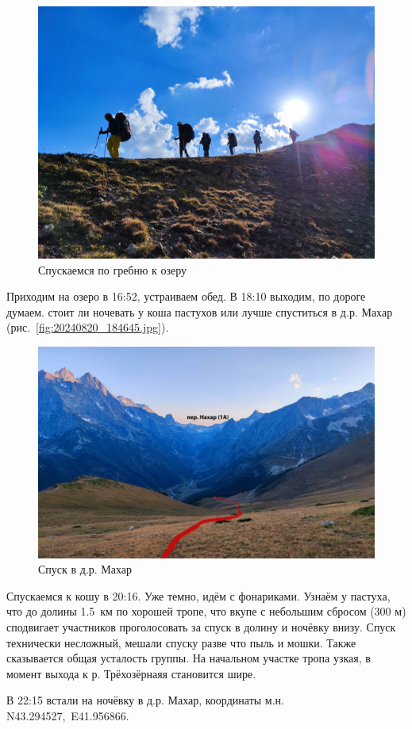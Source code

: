\begin{figure}[h!]
	\centering
	\includegraphics[width=0.7\linewidth]{../pics/IMG_20240820_164917.jpg}
	\caption{Спускаемся по гребню к озеру}
	\label{fig:IMG_20240820_164917.jpg}
\end{figure}

Приходим на озеро в 16:52, устраиваем обед. В 18:10 выходим, по дороге думаем. стоит ли ночевать у коша пастухов или лучше спуститься в д.р. Махар (рис.~\ref{fig:20240820_184645.jpg}).

\begin{figure}[h!]
	\centering
	\includegraphics[width=0.7\linewidth]{../pics/IMG_20240820_184645.jpg}
	\caption{Спуск в д.р. Махар}
	\label{fig:IMG_20240820_184645.jpg}
\end{figure}

Спускаемся к кошу в 20:16. Уже темно, идём с фонариками. Узнаём у пастуха, что до долины 1.5~км по хорошей тропе, что вкупе с небольшим сбросом (300 м) сподвигает участников проголосовать за спуск в долину и ночёвку внизу. Спуск технически несложный, мешали спуску разве что пыль и мошки. Также сказывается общая усталость группы. На начальном участке тропа узкая, в момент выхода к р. Трёхозёрнаяя становится шире.

В 22:15 встали на ночёвку в д.р. Махар, координаты м.н. N43.294527\degree,~E41.956866\degree.


\clearpage
